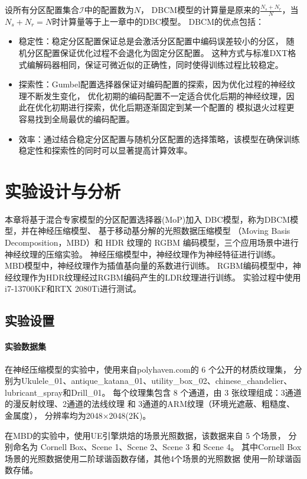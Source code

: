 设所有分区配置集合$\mathcal{I}$中的配置数为$N$，
DBCM模型的计算量是原来的$\frac{N_s+N_r}{N}$，当$N_s+N_r=N$时计算量等于上一章中的DBC模型。
DBCM的优点包括：
\begin{itemize}
\item 稳定性：稳定分区配置保证总是会激活分区配置中编码误差较小的分区，
随机分区配置保证优化过程不会退化为固定分区配置。
这种方式与标准DXT格式编解码器相同，保证可微近似的正确性，同时使得训练过程比较稳定。
\item 探索性：Gumbel配置选择器保证对编码配置的探索，因为优化过程的神经纹理不断发生变化，
优化初期的编码配置不一定适合优化后期的神经纹理，因此在优化初期进行探索，优化后期逐渐固定到某一个配置的
模拟退火过程更容易找到全局最优的编码配置。
\item 效率：通过结合稳定分区配置与随机分区配置的选择策略，该模型在确保训练稳定性和探索性的同时可以显著提高计算效率。
\end{itemize}


\section{实验设计与分析}

本章将基于混合专家模型的分区配置选择器(MoP)加入
DBC模型，称为DBCM模型，并在神经压缩模型、
基于移动基分解的光照数据压缩模型
\cite{silvennoinen2021moving}（Moving Basis Decomposition，MBD）和
HDR 纹理的 RGBM 编码模型，三个应用场景中进行神经纹理的压缩实验。
神经压缩模型中，神经纹理作为神经特征进行训练。
MBD模型中，神经纹理作为插值基向量的系数进行训练。
RGBM编码模型中，神经纹理作为HDR纹理经过RGBM编码产生的LDR纹理进行训练。
实验过程中使用i7-13700KF和RTX 2080Ti进行测试。

\subsection{实验设置}

\paragraph{实验数据集}

在神经压缩模型的实验中，使用来自polyhaven.com\cite{PolyHaven}的 6 个公开的材质纹理集，
分别为Ukulele\_01、antique\_katana\_01、utility\_box\_02、chinese\_chandelier、
lubricant\_spray和Drill\_01。
每个纹理集包含 8 个通道，由 3 张纹理组成：3通道的漫反射纹理、2通道的法线纹理 和 3通道的ARM纹理（环境光遮蔽、粗糙度、金属度），
分辨率均为2048×2048(2K)。

在MBD的实验中，使用UE引擎烘焙的场景光照数据，该数据来自 5 个场景，
分别命名为 Cornell Box、Scene 1、Scene 2、Scene 3 和 Scene 4。
其中Cornell Box场景的光照数据使用二阶球谐函数存储，其他4个场景的光照数据
使用一阶球谐函数存储。

